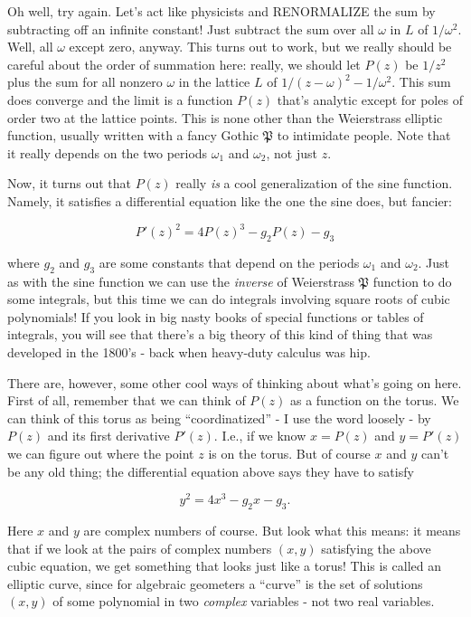 \documentclass{article}
\begin{document}
Oh well, try again. Let's act like physicists and RENORMALIZE the sum by
subtracting off an infinite constant! Just subtract the sum over all
\(\omega\) in \(L\) of \(1/\omega^2\). Well, all \(\omega\) except zero,
anyway. This turns out to work, but we really should be careful about
the order of summation here: really, we should let \(P(z)\) be \(1/z^2\)
plus the sum for all nonzero \(\omega\) in the lattice \(L\) of
\(1/(z - \omega)^2 - 1/\omega^2\). This sum does converge and the limit
is a function \(P(z)\) that's analytic except for poles of order two at
the lattice points. This is none other than the Weierstrass elliptic
function, usually written with a fancy Gothic \(\mathfrak{P}\) to
intimidate people. Note that it really depends on the two periods
\(\omega_1\) and \(\omega_2\), not just \(z\).

Now, it turns out that \(P(z)\) really \emph{is} a cool generalization
of the sine function. Namely, it satisfies a differential equation like
the one the sine does, but fancier:

\[P'(z)^2 = 4 P(z)^3 - g_2 P(z) - g_3\]

where \(g_2\) and \(g_3\) are some constants that depend on the periods
\(\omega_1\) and \(\omega_2\). Just as with the sine function we can use
the \emph{inverse} of Weierstrass \(\mathfrak{P}\) function to do some
integrals, but this time we can do integrals involving square roots of
cubic polynomials! If you look in big nasty books of special functions
or tables of integrals, you will see that there's a big theory of this
kind of thing that was developed in the 1800's - back when heavy-duty
calculus was hip.

There are, however, some other cool ways of thinking about what's going
on here. First of all, remember that we can think of \(P(z)\) as a
function on the torus. We can think of this torus as being
``coordinatized'' - I use the word loosely - by \(P(z)\) and its first
derivative \(P'(z)\). I.e., if we know \(x = P(z)\) and \(y = P'(z)\) we
can figure out where the point \(z\) is on the torus. But of course
\(x\) and \(y\) can't be any old thing; the differential equation above
says they have to satisfy

\[y^2 = 4x^3 - g_2 x - g_3.\]

Here \(x\) and \(y\) are complex numbers of course. But look what this
means: it means that if we look at the pairs of complex numbers
\((x,y)\) satisfying the above cubic equation, we get something that
looks just like a torus! This is called an elliptic curve, since for
algebraic geometers a ``curve'' is the set of solutions \((x,y)\) of
some polynomial in two \emph{complex} variables - not two real
variables.
\end{document}
